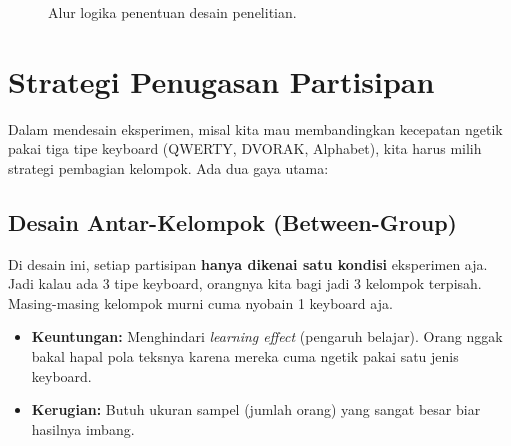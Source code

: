 \documentclass[12pt,a4paper]{article}
\begin{document}
\begin{figure}[h]
    \centering
    \caption{Alur logika penentuan desain penelitian.}
\end{figure}

\newpage
\section{Strategi Penugasan Partisipan}

Dalam mendesain eksperimen, misal kita mau membandingkan kecepatan ngetik pakai tiga tipe keyboard (QWERTY, DVORAK, Alphabet), kita harus milih strategi pembagian kelompok. Ada dua gaya utama:

\subsection{Desain Antar-Kelompok (Between-Group)}
Di desain ini, setiap partisipan \textbf{hanya dikenai satu kondisi} eksperimen aja. Jadi kalau ada 3 tipe keyboard, orangnya kita bagi jadi 3 kelompok terpisah. Masing-masing kelompok murni cuma nyobain 1 keyboard aja.
\begin{itemize}
    \item \textbf{Keuntungan:} Menghindari \textit{learning effect} (pengaruh belajar). Orang nggak bakal hapal pola teksnya karena mereka cuma ngetik pakai satu jenis keyboard.
    \item \textbf{Kerugian:} Butuh ukuran sampel (jumlah orang) yang sangat besar biar hasilnya imbang.
\end{itemize}
\end{document}
